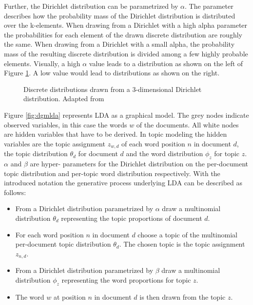 Further, the Dirichlet distribution can be parametrized by $\alpha$. The parameter describes how the probability mass of the Dirichlet distribution is distributed over the k-elements. When drawing from a Dirichlet with a high alpha parameter the probabilities for each element of the drawn discrete distribution are roughly the same. When drawing from a Dirichlet with a small alpha, the probability mass of the resulting discrete distribution is divided among a few highly probable elements. Visually, a high $\alpha$ value leads to a distribution as shown on the left of Figure \ref{fig:dirichlet1}. A low value would lead to distributions as shown on the right.

\begin{figure}
	\centering
	
	\caption[Discrete distributions drawn from a 3-dimensional Dirichlet distribution]{Discrete distributions drawn from a 3-dimensional Dirichlet distribution. Adapted from \cite{Widmer2018}}
	\label{fig:dirichlet1}	
\end{figure}

Figure \ref{fig:dgmlda} represents \ac{LDA} as a graphical model. The grey nodes indicate observed variables, in this case the words $w$ of the documents. All white nodes are hidden variables that have to be derived. In topic modeling the hidden variables are the topic assignment $z_{w,d}$ of each word position $n$ in document $d$, the topic distribution $\theta_d$ for document $d$ and the word distribution $\phi_z$ for topic $z$. $\alpha$ and $\beta$ are hyper- parameters for the Dirichlet distribution on the per-document topic distribution and per-topic word distribution respectively.
With the introduced notation the generative process underlying \ac{LDA} can be described as follows:

\begin{itemize}
	\item From a Dirichlet distribution parametrized by $\alpha$ draw a multinomial distribution $\theta_d$ representing the topic proportions of document $d$. 
	\item For each word position $n$ in document $d$ choose a topic of the multinomial per-document topic distribution $\theta_d$. The chosen topic is the topic assignment $z_{n,d}$.
	\item From a Dirichlet distribution parametrized by $\beta$ draw a multinomial distribution $\phi_z$ representing the word proportions for topic $z$.
	\item The word $w$ at position $n$ in document $d$ is then drawn from the topic $z$. 
\end{itemize}

